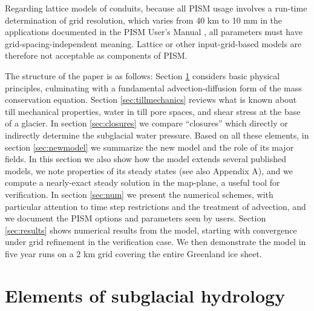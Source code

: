 \documentclass[gmd]{copernicus}   %
\begin{document}
Regarding lattice models of conduits, because all PISM usage involves a run-time determination of grid resolution, which varies from 40 km to 10 mm in the applications documented in the PISM User's Manual \citep{pism-user-manual}, all parameters must have grid-spacing-independent meaning.  Lattice or other input-grid-based models are therefore not acceptable as components of PISM.

The structure of the paper is as follows: Section \ref{sec:elements} considers basic physical principles, culminating with a fundamental advection-diffusion form of the mass conservation equation.  Section \ref{sec:tillmechanics} reviews what is known about till mechanical properties, water in till pore spaces, and shear stress at the base of a glacier.  In section \ref{sec:closures} we compare ``closures'' which directly or indirectly determine the subglacial water pressure.  Based on all these elements, in section \ref{sec:newmodel} we summarize the new model and the role of its major fields.  In this section we also show how the model extends several published models, we note properties of its steady states (see also Appendix A), and we compute a nearly-exact steady solution in the map-plane, a useful tool for verification.  In section \ref{sec:num} we present the numerical schemes, with particular attention to time step restrictions and the treatment of advection, and we document the PISM options and parameters seen by users.  Section \ref{sec:results} shows numerical results from the model, starting with convergence under grid refinement in the verification case.  We then demonstrate the model in five year runs on a 2 km grid covering the entire Greenland ice sheet.


\section{Elements of subglacial hydrology} \label{sec:elements}
\end{document}

